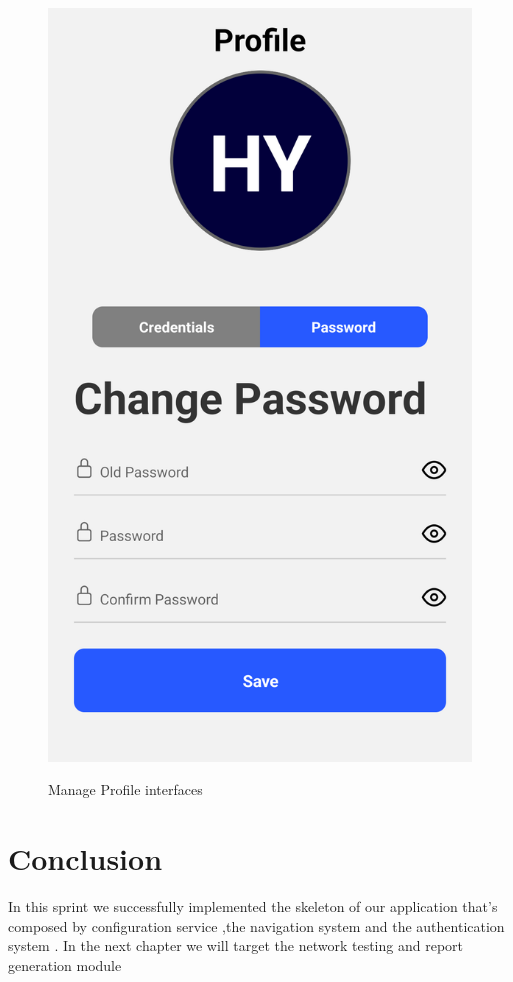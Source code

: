 \begin{figure}[H]
\begin{minipage}{0.45\textwidth}
    \label{fig:login-form}
\end{minipage}\hfill
\begin{minipage}{0.45\textwidth}
    \centering
    \includegraphics[width=\linewidth]{images/chap2/editPwd.png}
    \label{fig:login-form-filled}
\end{minipage}
    \caption{Manage Profile interfaces}
\end{figure}
\section*{Conclusion}
In this sprint we successfully implemented the skeleton of our application that's composed by configuration service ,the navigation system and the authentication system . In the next chapter we will target  the network testing and report generation  module 